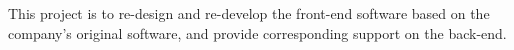 
This project is to re-design and re-develop the front-end software based on the company's original software,
and provide corresponding support on the back-end.
